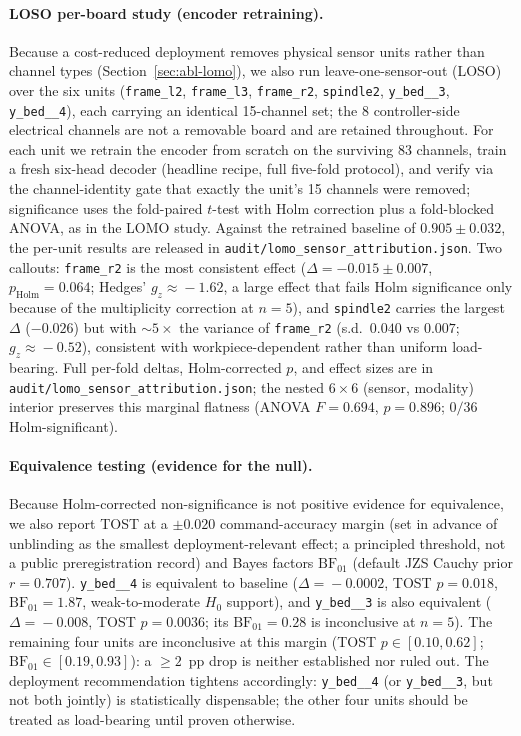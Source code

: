 \documentclass[sensors,article,submit,moreauthors,pdftex]{Definitions/mdpi}
\begin{document}
\paragraph{LOSO per-board study (encoder retraining).} Because a cost-reduced deployment removes physical sensor units rather than channel types (Section~\ref{sec:abl-lomo}), we also run leave-one-sensor-out (LOSO) over the six units (\texttt{frame\_l2}, \texttt{frame\_l3}, \texttt{frame\_r2}, \texttt{spindle2}, \texttt{y\_bed\_\_3}, \texttt{y\_bed\_\_4}), each carrying an identical 15-channel set; the 8 controller-side electrical channels are not a removable board and are retained throughout. For each unit we retrain the encoder from scratch on the surviving 83 channels, train a fresh six-head decoder (headline recipe, full five-fold protocol), and verify via the channel-identity gate that exactly the unit's 15 channels were removed; significance uses the fold-paired $t$-test with Holm correction plus a fold-blocked ANOVA, as in the LOMO study. Against the retrained baseline of $0.905 \pm 0.032$, the per-unit results are released in \texttt{audit/lomo\_sensor\_attribution.json}. Two callouts: \texttt{frame\_r2} is the most consistent effect ($\Delta = -0.015 \pm 0.007$, $p_{\text{Holm}} = 0.064$; Hedges' $g_{z}\!\approx\!-1.62$, a large effect that fails Holm significance only because of the multiplicity correction at $n\!=\!5$), and \texttt{spindle2} carries the largest $\Delta$ ($-0.026$) but with ${\sim}5\times$ the variance of \texttt{frame\_r2} (s.d.\ $0.040$ vs $0.007$; $g_{z}\!\approx\!-0.52$), consistent with workpiece-dependent rather than uniform load-bearing. Full per-fold deltas, Holm-corrected $p$, and effect sizes are in \texttt{audit/lomo\_sensor\_attribution.json}; the nested $6\!\times\!6$ (sensor, modality) interior preserves this marginal flatness (ANOVA $F\!=\!0.694$, $p\!=\!0.896$; $0/36$ Holm-significant).

\paragraph{Equivalence testing (evidence for the null).} Because Holm-corrected non-significance is not positive evidence for equivalence, we also report TOST at a $\pm 0.020$ command-accuracy margin (set in advance of unblinding as the smallest deployment-relevant effect; a principled threshold, not a public preregistration record) and Bayes factors $\mathrm{BF}_{01}$ (default JZS Cauchy prior $r\!=\!0.707$). \texttt{y\_bed\_\_4} is equivalent to baseline ($\Delta\!=\!-0.0002$, TOST $p\!=\!0.018$, $\mathrm{BF}_{01}\!=\!1.87$, weak-to-moderate $H_0$ support), and \texttt{y\_bed\_\_3} is also equivalent ($\Delta\!=\!-0.008$, TOST $p\!=\!0.0036$; its $\mathrm{BF}_{01}\!=\!0.28$ is inconclusive at $n\!=\!5$). The remaining four units are inconclusive at this margin (TOST $p\!\in\![0.10, 0.62]$; $\mathrm{BF}_{01}\!\in\![0.19, 0.93]$): a $\ge 2$~pp drop is neither established nor ruled out. The deployment recommendation tightens accordingly: \texttt{y\_bed\_\_4} (or \texttt{y\_bed\_\_3}, but not both jointly) is statistically dispensable; the other four units should be treated as load-bearing until proven otherwise.
\end{document}
